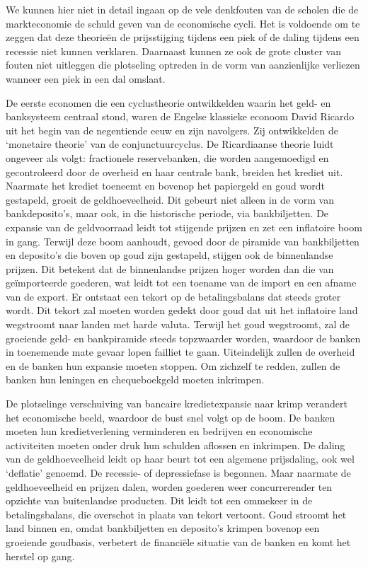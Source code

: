 \documentclass[
  a5paper,
  smalldemyvopaper,10pt,twoside,onecolumn,openright,extrafontsizes,hidelinks]{memoir}
\begin{document}
We kunnen hier niet in detail ingaan op de vele denkfouten van de
scholen die de markteconomie de schuld geven van de economische cycli.
Het is voldoende om te zeggen dat deze theorieën de prijsstijging
tijdens een piek of de daling tijdens een recessie niet kunnen
verklaren. Daarnaast kunnen ze ook de grote cluster van fouten niet
uitleggen die plotseling optreden in de vorm van aanzienlijke verliezen
wanneer een piek in een dal omslaat.

De eerste economen die een cyclustheorie ontwikkelden waarin het geld-
en banksysteem centraal stond, waren de Engelse klassieke econoom David
Ricardo uit het begin van de negentiende eeuw en zijn navolgers. Zij
ontwikkelden de `monetaire theorie' van de conjunctuurcyclus. De
Ricardiaanse theorie luidt ongeveer als volgt: fractionele
reservebanken, die worden aangemoedigd en gecontroleerd door de overheid
en haar centrale bank, breiden het krediet uit. Naarmate het krediet
toeneemt en bovenop het papiergeld en goud wordt gestapeld, groeit de
geldhoeveelheid. Dit gebeurt niet alleen in de vorm van bankdeposito's,
maar ook, in die historische periode, via bankbiljetten. De expansie van
de geldvoorraad leidt tot stijgende prijzen en zet een inflatoire boom
in gang. Terwijl deze boom aanhoudt, gevoed door de piramide van
bankbiljetten en deposito's die boven op goud zijn gestapeld, stijgen
ook de binnenlandse prijzen. Dit betekent dat de binnenlandse prijzen
hoger worden dan die van geïmporteerde goederen, wat leidt tot een
toename van de import en een afname van de export. Er ontstaat een
tekort op de betalingsbalans dat steeds groter wordt. Dit tekort zal
moeten worden gedekt door goud dat uit het inflatoire land wegstroomt
naar landen met harde valuta. Terwijl het goud wegstroomt, zal de
groeiende geld- en bankpiramide steeds topzwaarder worden, waardoor de
banken in toenemende mate gevaar lopen failliet te gaan. Uiteindelijk
zullen de overheid en de banken hun expansie moeten stoppen. Om zichzelf
te redden, zullen de banken hun leningen en chequeboekgeld moeten
inkrimpen.

De plotselinge verschuiving van bancaire kredietexpansie naar krimp
verandert het economische beeld, waardoor de bust snel volgt op de boom.
De banken moeten hun kredietverlening verminderen en bedrijven en
economische activiteiten moeten onder druk hun schulden aflossen en
inkrimpen. De daling van de geldhoeveelheid leidt op haar beurt tot een
algemene prijsdaling, ook wel `deflatie' genoemd. De recessie- of
depressiefase is begonnen. Maar naarmate de geldhoeveelheid en prijzen
dalen, worden goederen weer concurrerender ten opzichte van buitenlandse
producten. Dit leidt tot een ommekeer in de betalingsbalans, die
overschot in plaats van tekort vertoont. Goud stroomt het land binnen
en, omdat bankbiljetten en deposito's krimpen bovenop een groeiende
goudbasis, verbetert de financiële situatie van de banken en komt het
herstel op gang.
\end{document}
